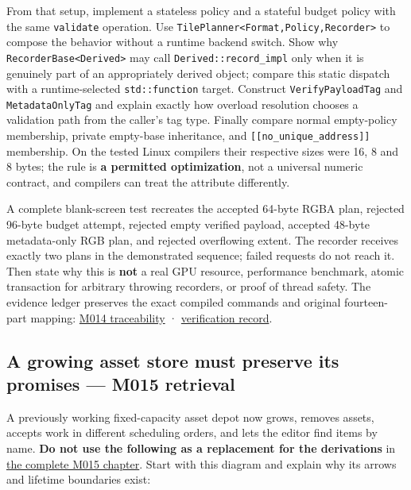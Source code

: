 From that setup, implement a stateless policy and a stateful budget policy with the same \texttt{validate} operation. Use \texttt{TilePlanner\textless{}Format,Policy,Recorder\textgreater{}} to compose the behavior without a runtime backend switch. Show why \texttt{RecorderBase\textless{}Derived\textgreater{}} may call \texttt{Derived::record\_impl} only when it is genuinely part of an appropriately derived object; compare this static dispatch with a runtime-selected \texttt{std::function} target. Construct \texttt{VerifyPayloadTag} and \texttt{MetadataOnlyTag} and explain exactly how overload resolution chooses a validation path from the caller's tag type. Finally compare normal empty-policy membership, private empty-base inheritance, and \texttt{{[}{[}no\_unique\_address{]}{]}} membership. On the tested Linux compilers their respective sizes were 16, 8 and 8 bytes; the rule is \textbf{a permitted optimization}, not a universal numeric contract, and compilers can treat the attribute differently.

A complete blank-screen test recreates the accepted 64-byte RGBA plan, rejected 96-byte budget attempt, rejected empty verified payload, accepted 48-byte metadata-only RGB plan, and rejected overflowing extent. The recorder receives exactly two plans in the demonstrated sequence; failed requests do not reach it. Then state why this is \textbf{not} a real GPU resource, performance benchmark, atomic transaction for arbitrary throwing recorders, or proof of thread safety. The evidence ledger preserves the exact compiled commands and original fourteen-part mapping: \hyperref[appendix-fd090d982a15]{M014 traceability} · \hyperref[appendix-a103e7846d21]{verification record}.

\subsection{A growing asset store must preserve its promises --- M015 retrieval}\label{a-growing-asset-store-must-preserve-its-promises-m015-retrieval}

A previously working fixed-capacity asset depot now grows, removes assets, accepts work in different scheduling orders, and lets the editor find items by name. \textbf{Do not use the following as a replacement for the derivations} in \href{Continuous\%20Notes/Computing\%20Foundations\%20-\%20From\%20Bits\%20to\%20C++\%20and\%20Systems\%20APIs\#An\%20asset\%20registry\%20grows\%20while\%20its\%20handles\%20must\%20not\%20change}{the complete M015 chapter}. Start with this diagram and explain why its arrows and lifetime boundaries exist:

